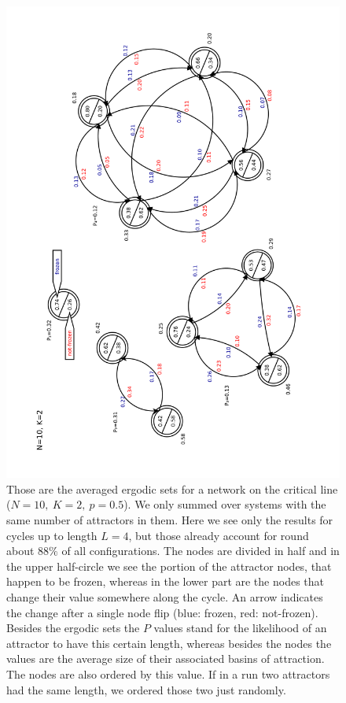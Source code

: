 \paragraph*{}
\begin{figure}[t]
	\includegraphics[height=\textwidth,angle=-90]{Plots/ergodic_set}
	\centering
	\caption{Those are the averaged ergodic sets for a network on the critical line ($ N = 10,\ K = 2,\ p = 0.5 $). We only summed over systems with the same number of attractors in them. Here we see only the results for cycles up to length $ L = 4 $, but those already account for round about $ 88\% $ of all configurations. The nodes are divided in half and in the upper half-circle we see the portion of the attractor nodes, that happen to be frozen, whereas in the lower part are the nodes that change their value somewhere along the cycle. An arrow indicates the change after a single node flip (blue: frozen, red: not-frozen). Besides the ergodic sets the $ P $ values stand for the likelihood of an attractor to have this certain length, whereas besides the nodes the values are the average size of their associated basins of attraction. The nodes are also ordered by this value. If in a run two attractors had the same length, we ordered those two just randomly.}
	\label{fig:ergodic_set}
\end{figure}

